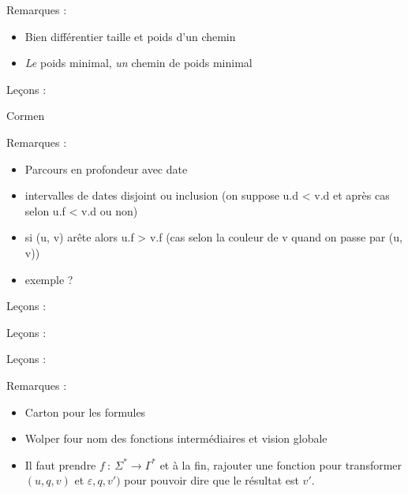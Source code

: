 \documentclass[../Agregation.tex]{subfiles}
\begin{document}
Remarques :
\begin{itemize}
	\item Bien différentier taille et poids d'un chemin
	\item \emph{Le} poids minimal, \emph{un} chemin de poids minimal
\end{itemize}

Leçons :
\begin{itemize}
\end{itemize}
Cormen

Remarques :
\begin{itemize}
	\item Parcours en profondeur avec date
	\item intervalles de dates disjoint ou inclusion (on suppose u.d < v.d et après cas selon u.f < v.d ou non)
	\item si (u, v) arête alors u.f > v.f (cas selon la couleur de v quand on passe par (u, v))
	\item exemple ?
\end{itemize}


Leçons :
\begin{itemize}
\end{itemize}

Leçons :
\begin{itemize}
\end{itemize}


Leçons :
\begin{itemize}
\end{itemize}

Remarques :
\begin{itemize}
	\item Carton pour les formules
	\item Wolper four nom des fonctions intermédiaires et vision globale
	\item Il faut prendre $f~:~\Sigma^* \to \Gamma^*$ et à la fin, rajouter une fonction pour transformer $(u, q, v)$ et $\varepsilon, q, v')$ pour pouvoir dire que le résultat est $v'$.
\end{itemize}
\end{document}
